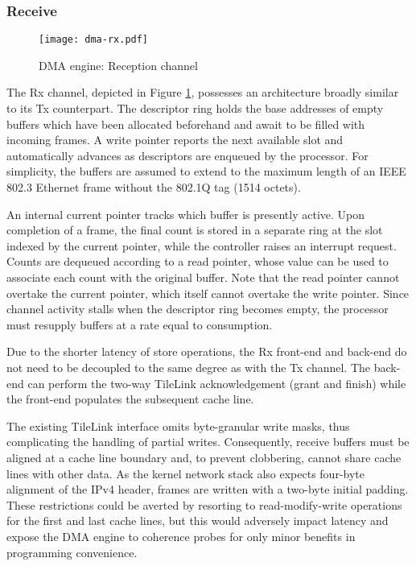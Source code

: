 \subsubsection{Receive}

\begin{figure}[t]
\begin{center}
\texttt{[image: dma-rx.pdf]}
\caption{DMA engine: Reception channel}
\label{fig:dma-rx}
\end{center}
\end{figure}

The Rx channel, depicted in Figure \ref{fig:dma-rx}, possesses an
architecture broadly similar to its Tx counterpart.
The descriptor ring holds the base addresses of empty buffers which have
been allocated beforehand and await to be filled with incoming frames.
A write pointer reports the next available slot and automatically
advances as descriptors are enqueued by the processor.
For simplicity, the buffers are assumed to extend to the maximum length
of an IEEE 802.3 Ethernet frame without the 802.1Q tag (1514 octets).

An internal current pointer tracks which buffer is presently active.
Upon completion of a frame, the final count is stored in a separate ring
at the slot indexed by the current pointer, while the controller raises
an interrupt request.
Counts are dequeued according to a read pointer, whose value can be used
to associate each count with the original buffer.
Note that the read pointer cannot overtake the current pointer, which
itself cannot overtake the write pointer.
Since channel activity stalls when the descriptor ring becomes empty,
the processor must resupply buffers at a rate equal to consumption.

Due to the shorter latency of store operations, the Rx front-end and
back-end do not need to be decoupled to the same degree as with the Tx
channel.
The back-end can perform the two-way TileLink acknowledgement (grant and
finish) while the front-end populates the subsequent cache line.

The existing TileLink interface omits byte-granular write masks, thus
complicating the handling of partial writes.
Consequently, receive buffers must be aligned at a cache line boundary
and, to prevent clobbering, cannot share cache lines with other data.
As the kernel network stack also expects four-byte alignment of the IPv4
header, frames are written with a two-byte initial padding.
These restrictions could be averted by resorting to read-modify-write
operations for the first and last cache lines, but this would adversely
impact latency and expose the DMA engine to coherence probes for only
minor benefits in programming convenience.
